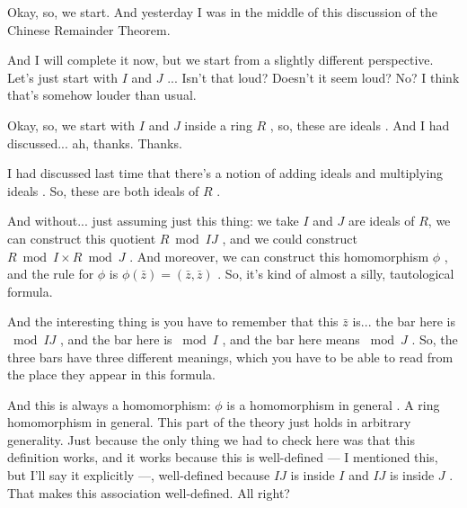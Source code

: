 \begin{speech}[00:00:00 - 00:02:30]
Okay, so, we start. And yesterday I was in the middle of this discussion of the Chinese Remainder Theorem. 

And I will complete it now, but we start from a slightly different perspective. Let's just start with $I$ and $J$ ... Isn't that loud? Doesn't it seem loud? No? I think that's somehow louder than usual.

Okay, so, we start with $I$ and $J$ inside a ring $R$ , so, these are ideals . And I had discussed... ah, thanks.  Thanks.

I had discussed last time that there's a notion of adding ideals  and multiplying ideals . So, these are both ideals of $R$ .

And without... just assuming just this thing: we take $I$ and $J$ are ideals of $R$, we can construct this quotient $R \bmod IJ$ , and we could construct $R \bmod I \times R \bmod J$ . And moreover, we can construct this homomorphism $\phi$ , and the rule for $\phi$ is $\phi(\bar{z}) = (\bar{z}, \bar{z})$ . So, it's kind of almost a silly, tautological formula.

And the interesting thing is you have to remember that this $\bar{z}$ is... the bar here is $\bmod IJ$ , and the bar here is $\bmod I$ , and the bar here means $\bmod J$ . So, the three bars have three different meanings, which you have to be able to read from the place they appear in this formula.

And this is always a homomorphism: $\phi$ is a homomorphism in general . A ring homomorphism in general. This part of the theory just holds in arbitrary generality. Just because the only thing we had to check here was that this definition works, and it works because this is well-defined  --- I mentioned this, but I'll say it explicitly ---, well-defined because $IJ$ is inside $I$  and $IJ$ is inside $J$ . That makes this association well-defined. All right?
\end{speech}

